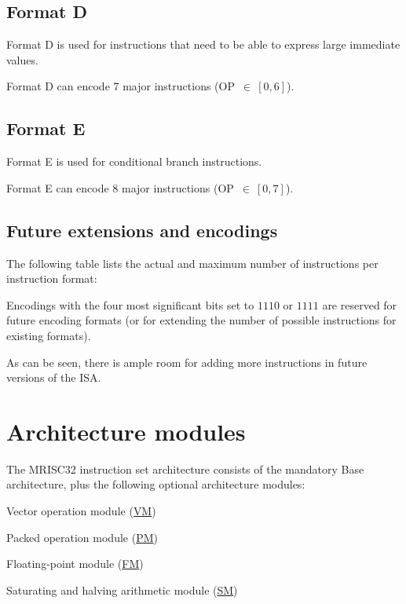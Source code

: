 \subsection{Format D}

Format D is used for instructions that need to be able to express large
immediate values.

Format D can encode 7 major instructions (OP~$\in~[0,6]$).

\subsection{Format E}

Format E is used for conditional branch instructions.

Format E can encode 8 major instructions (OP~$\in~[0,7]$).

\subsection{Future extensions and encodings}

The following table lists the actual and maximum number of instructions per
instruction format:



Encodings with the four most significant bits set to $1110$ or $1111$ are
reserved for future encoding formats (or for extending the number of possible
instructions for existing formats).

As can be seen, there is ample room for adding more instructions in future
versions of the ISA.

\section{Architecture modules}

The MRISC32 instruction set architecture consists of the mandatory Base
architecture, plus the following optional architecture modules:

\begin{bulletitems}
  \item Vector operation module (\hyperref[module:VM]{VM})
  \item Packed operation module (\hyperref[module:PM]{PM})
  \item Floating-point module (\hyperref[module:FM]{FM})
  \item Saturating and halving arithmetic module (\hyperref[module:SM]{SM})
\end{bulletitems}
